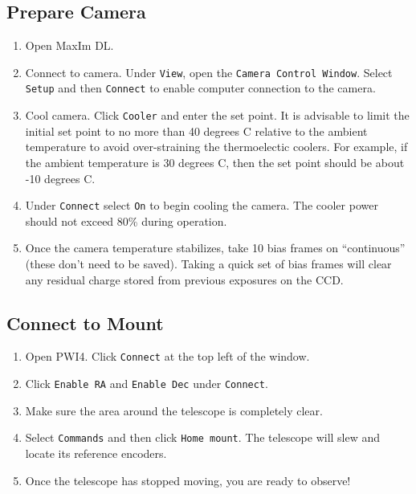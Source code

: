 \documentclass{article}
\begin{document}
	\subsection{Prepare Camera}
	
	\begin{enumerate}
		
		\item Open MaxIm DL.
		
		\item Connect to camera. Under \texttt{View}, open the \texttt{Camera Control Window}. Select \texttt{Setup} and then \texttt{Connect} to enable computer connection to the camera.
		
		\item Cool camera. Click \texttt{Cooler} and enter the set point. It is advisable to limit the initial set point to no more than 40 degrees C relative to the ambient temperature to avoid over-straining the thermoelectic coolers. For example, if the ambient temperature is 30 degrees C, then the set point should be about -10 degrees C.
		
		\item Under \texttt{Connect} select \texttt{On} to begin cooling the camera. The cooler power should not exceed 80\% during operation.
		
		\item Once the camera temperature stabilizes, take 10 bias frames on ``continuous'' (these don't need to be saved). Taking a quick set of bias frames will clear any residual charge stored from previous exposures on the CCD.
		
	\end{enumerate}
	
	\subsection{Connect to Mount}
	
	\begin{enumerate}
		
		\item Open PWI4. Click \texttt{Connect} at the top left of the window.
		
		\item Click \texttt{Enable RA} and \texttt{Enable Dec} under \texttt{Connect}.
		
		\item Make sure the area around the telescope is completely clear.
		
		\item Select \texttt{Commands} and then click \texttt{Home mount}. The telescope will slew and locate its reference encoders.
		
		\item Once the telescope has stopped moving, you are ready to observe!
		
	\end{enumerate}
	
\end{document}
